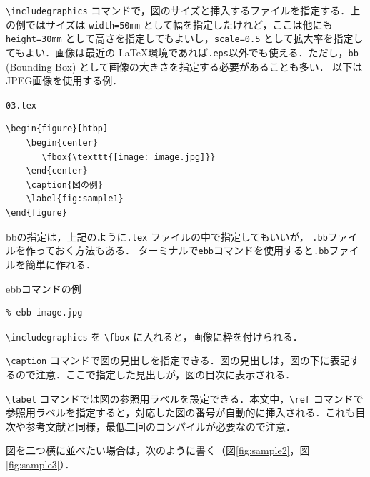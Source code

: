 \verb|\includegraphics| コマンドで，図のサイズと挿入するファイルを指定する．上の例ではサイズは {\tt width=50mm} として幅を指定したけれど，ここは他にも {\tt height=30mm} として高さを指定してもよいし，{\tt scale=0.5} として拡大率を指定してもよい．画像は最近の \LaTeX 環境であれば{\tt *.eps}以外でも使える．ただし，{\tt bb} (Bounding Box) として画像の大きさを指定する必要があることも多い．
以下はJPEG画像を使用する例．

\begin{itembox}[l]{{\tt 03.tex}}
\begin{verbatim}
\begin{figure}[htbp]
    \begin{center}
       \fbox{\texttt{[image: image.jpg]}}
    \end{center}
    \caption{図の例}
    \label{fig:sample1}
\end{figure}
\end{verbatim}
\end{itembox}

bbの指定は，上記のように{\tt *.tex} ファイルの中で指定してもいいが，
{\tt *.bb}ファイルを作っておく方法もある．
ターミナルで{\tt ebb}コマンドを使用すると{\tt *.bb}ファイルを簡単に作れる．


\begin{itembox}[l]{ebbコマンドの例}
\begin{verbatim}
% ebb image.jpg
\end{verbatim}
\end{itembox}


\verb|\includegraphics| を \verb|\fbox| に入れると，画像に枠を付けられる．

\verb|\caption| コマンドで図の見出しを指定できる．図の見出しは，図の下に表記するので注意．ここで指定した見出しが，図の目次に表示される．

\verb|\label| コマンドでは図の参照用ラベルを設定できる．本文中，\verb|\ref| コマンドで参照用ラベルを指定すると，対応した図の番号が自動的に挿入される．これも目次や参考文献と同様，最低二回のコンパイルが必要なので注意．

図を二つ横に並べたい場合は，次のように書く（図\ref{fig:sample2}，図\ref{fig:sample3}）．

